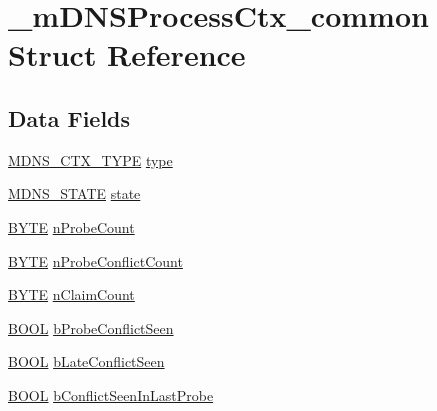 \hypertarget{struct__m_d_n_s_process_ctx__common}{}\section{\+\_\+m\+D\+N\+S\+Process\+Ctx\+\_\+common Struct Reference}
\label{struct__m_d_n_s_process_ctx__common}
\subsection*{Data Fields}
\begin{DoxyCompactItemize}
\item 
\hyperlink{_zeroconf_multicast_d_n_s_8c_a1181d5fa8f2aec7e5d635f1f04f47554}{M\+D\+N\+S\+\_\+\+C\+T\+X\+\_\+\+T\+Y\+P\+E} \hyperlink{struct__m_d_n_s_process_ctx__common_ad25f99368b3000728a36c5c1a0df39af}{type}
\item 
\hyperlink{_zeroconf_multicast_d_n_s_8c_a13d840af9cc0f5efa211563f570a992f}{M\+D\+N\+S\+\_\+\+S\+T\+A\+T\+E} \hyperlink{struct__m_d_n_s_process_ctx__common_a285cc4b1cd330e4d0b38ea8452db93ac}{state}
\item 
\hyperlink{_generic_type_defs_8h_a4ae1dab0fb4b072a66584546209e7d58}{B\+Y\+T\+E} \hyperlink{struct__m_d_n_s_process_ctx__common_a548d5c1faecad090ecdce204e9c174f0}{n\+Probe\+Count}
\item 
\hyperlink{_generic_type_defs_8h_a4ae1dab0fb4b072a66584546209e7d58}{B\+Y\+T\+E} \hyperlink{struct__m_d_n_s_process_ctx__common_aa9900bcbea653f160eb721f777b1f203}{n\+Probe\+Conflict\+Count}
\item 
\hyperlink{_generic_type_defs_8h_a4ae1dab0fb4b072a66584546209e7d58}{B\+Y\+T\+E} \hyperlink{struct__m_d_n_s_process_ctx__common_aaa890aad472b735414cd54470e25f6e1}{n\+Claim\+Count}
\item 
\hyperlink{_generic_type_defs_8h_a54d65c7fa62e62c9754371e42f5111b9}{B\+O\+O\+L} \hyperlink{struct__m_d_n_s_process_ctx__common_a1b2db33f5a408a7a2b2fc19acb92ff80}{b\+Probe\+Conflict\+Seen}
\item 
\hyperlink{_generic_type_defs_8h_a54d65c7fa62e62c9754371e42f5111b9}{B\+O\+O\+L} \hyperlink{struct__m_d_n_s_process_ctx__common_ad084c67f660e33415a30016ed705ab09}{b\+Late\+Conflict\+Seen}
\item 
\hyperlink{_generic_type_defs_8h_a54d65c7fa62e62c9754371e42f5111b9}{B\+O\+O\+L} \hyperlink{struct__m_d_n_s_process_ctx__common_a0de5f3a8d43b2008f85ed7bf2ad2cfb4}{b\+Conflict\+Seen\+In\+Last\+Probe}
\item 

\end{DoxyCompactItemize}
